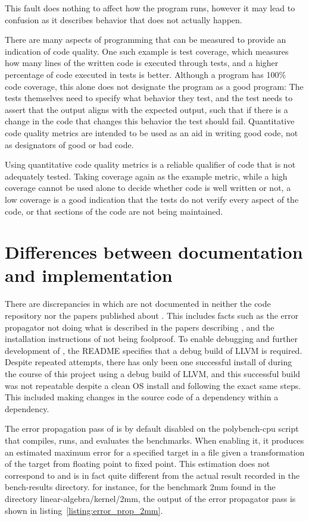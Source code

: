 This fault does nothing to affect how the program runs, however it may lead to confusion as it describes behavior that does not actually happen. 


There are many aspects of programming that can be measured to provide an indication of code quality. One such example is test coverage, which measures how many lines of the written code is executed through tests, and a higher percentage of code executed in tests is better. Although a program has 100\% code coverage, this alone does not designate the program as a good program: The tests themselves need to specify what behavior they test, and the test needs to assert that the output aligns with the expected output, such that if there is a change in the code that changes this behavior the test should fail. Quantitative code quality metrics are intended to be used as an aid in writing good code, not as designators of good or bad code. 

Using quantitative code quality metrics is a reliable qualifier of code that is not adequately tested. Taking coverage again as the example metric, while a high coverage cannot be used alone to decide whether code is well written or not, a low coverage is a good indication that the tests do not verify every aspect of the code, or that sections of the code are not being maintained.


\section{Differences between documentation and implementation}

There are discrepancies in \taffo{} which are not documented in neither the code repository nor the papers published about \taffo{}. 
This includes facts such as the error propagator not doing what is described in the papers describing \taffo{},  and the installation instructions of \taffo{} not being foolproof. To enable debugging and further development of \taffo{}, the README specifies that a debug build of LLVM is required. Despite repeated attempts, there has only been one successful install of \taffo{} during the course of this project using a debug build of LLVM, and this successful build was not repeatable despite a clean OS install and following the exact same steps. This included making changes in the source code of a dependency within a \taffo{} dependency.  

The error propagation pass of \taffo{} is by default disabled on the polybench-cpu script that compiles, runs, and evaluates the benchmarks. When enabling it, it produces an estimated maximum error for a specified target in a file given a transformation of the target from floating point to fixed point. This estimation does not correspond to and is in fact quite different from the actual result recorded in the bench-results directory. for instance, for the benchmark 2mm found in the directory linear-algebra/kernel/2mm, the output of the error propagator pass is shown in listing~\ref{listing:error_prop_2mm}.

